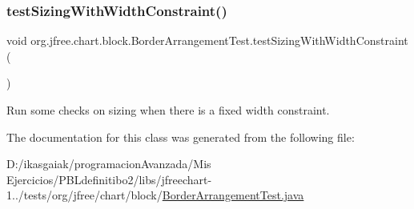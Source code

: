 \subsubsection{\texorpdfstring{test\+Sizing\+With\+Width\+Constraint()}{testSizingWithWidthConstraint()}}
{\footnotesize\ttfamily void org.\+jfree.\+chart.\+block.\+Border\+Arrangement\+Test.\+test\+Sizing\+With\+Width\+Constraint (\begin{DoxyParamCaption}{ }\end{DoxyParamCaption})}

Run some checks on sizing when there is a fixed width constraint. 

The documentation for this class was generated from the following file\+:\begin{DoxyCompactItemize}
\item 
D\+:/ikasgaiak/programacion\+Avanzada/\+Mis Ejercicios/\+P\+B\+Ldefinitibo2/libs/jfreechart-\/1../tests/org/jfree/chart/block/\mbox{\hyperlink{_border_arrangement_test_8java}{Border\+Arrangement\+Test.\+java}}\end{DoxyCompactItemize}
